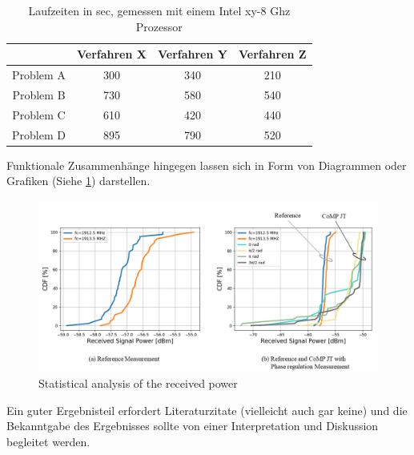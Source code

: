 \begin{table}[h!]
	\begin{center}
        \caption{Laufzeiten in sec, gemessen mit einem Intel xy-8 Ghz Prozessor}\label{TabLaufzeiten}
		\begin{tabular}{|c||c|c|c|}
			\hline 
			& Verfahren X & Verfahren Y & Verfahren Z \\ 
			\hline 
			\hline 
			\hspace{.1cm}
			Problem A & 300 & 340 & 210 \\ 
			\hline 
			\hspace{.1cm}
			Problem B & 730 & 580 & 540 \\ 
			\hline 
			\hspace{.1cm}
			Problem C & 610 & 420 & 440 \\ 
			\hline 
			\hspace{.1cm}
			Problem D & 895 & 790 & 520 \\ 
			\hline 
		\end{tabular} 
	\end{center}
\end{table}


Funktionale Zusammenhänge hingegen lassen sich in Form von Diagrammen oder Grafiken (Siehe \ref{fig:Abbildung1}) darstellen.


\begin{figure}[!htb]
	\centering
	\includegraphics[width=1\textwidth]{anlagen/bilder/Abbildung1}
	\caption{Statistical analysis of the received power}
	\label{fig:Abbildung1}
\end{figure}

Ein guter Ergebnisteil erfordert Literaturzitate (vielleicht auch gar keine) und die Bekanntgabe des Ergebnisses sollte von einer Interpretation und Diskussion begleitet werden. 


\newpage

